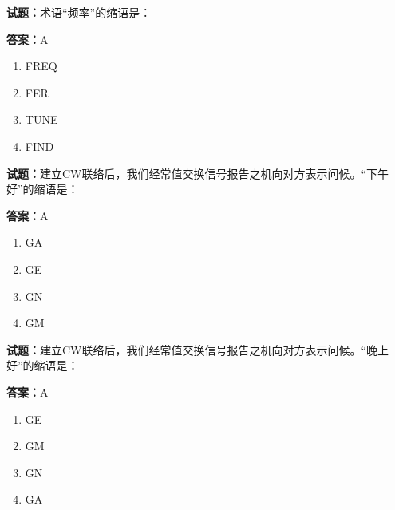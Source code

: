 \documentclass{ctexbook}
\begin{document}





\vspace{1em}

\textbf{试题：}术语“频率”的缩语是： 

\textbf{答案：}A 

\begin{enumerate}[leftmargin=3em]
  \item FREQ 

  \item FER 

  \item TUNE 

  \item FIND 

\end{enumerate}





\vspace{1em}

\textbf{试题：}建立CW联络后，我们经常值交换信号报告之机向对方表示问候。“下午好”的缩语是： 

\textbf{答案：}A 

\begin{enumerate}[leftmargin=3em]
  \item GA 

  \item GE 

  \item GN 

  \item GM 

\end{enumerate}





\vspace{1em}

\textbf{试题：}建立CW联络后，我们经常值交换信号报告之机向对方表示问候。“晚上好”的缩语是： 

\textbf{答案：}A 

\begin{enumerate}[leftmargin=3em]
  \item GE 

  \item GM 

  \item GN 

  \item GA 

\end{enumerate}
\end{document}
